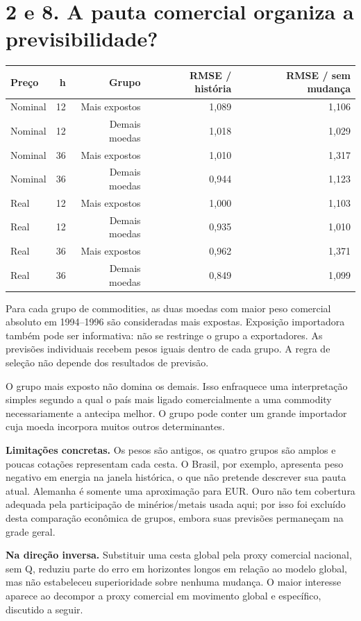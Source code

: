 \documentclass[11pt,a4paper]{article}
\begin{document}
\clearpage
\section*{2 e 8. A pauta comercial organiza a previsibilidade?}\small\begin{center}\begin{tabular}{lrrrr}\toprule
Preço & h & Grupo & RMSE / história & RMSE / sem mudança \\ \midrule
Nominal & 12 & Mais expostos & 1,089 & 1,106 \\
Nominal & 12 & Demais moedas & 1,018 & 1,029 \\
Nominal & 36 & Mais expostos & 1,010 & 1,317 \\
Nominal & 36 & Demais moedas & 0,944 & 1,123 \\
Real & 12 & Mais expostos & 1,000 & 1,103 \\
Real & 12 & Demais moedas & 0,935 & 1,010 \\
Real & 36 & Mais expostos & 0,962 & 1,371 \\
Real & 36 & Demais moedas & 0,849 & 1,099 \\
\bottomrule\end{tabular}\end{center}\normalsize

Para cada grupo de commodities, as duas moedas com maior peso comercial absoluto em 1994--1996 são consideradas mais expostas. Exposição importadora também pode ser informativa: não se restringe o grupo a exportadores. As previsões individuais recebem pesos iguais dentro de cada grupo. A regra de seleção não depende dos resultados de previsão.

O grupo mais exposto não domina os demais. Isso enfraquece uma interpretação simples segundo a qual o país mais ligado comercialmente a uma commodity necessariamente a antecipa melhor. O grupo pode conter um grande importador cuja moeda incorpora muitos outros determinantes.

\textbf{Limitações concretas.} Os pesos são antigos, os quatro grupos são amplos e poucas cotações representam cada cesta. O Brasil, por exemplo, apresenta peso negativo em energia na janela histórica, o que não pretende descrever sua pauta atual. Alemanha é somente uma aproximação para EUR. Ouro não tem cobertura adequada pela participação de minérios/metais usada aqui; por isso foi excluído desta comparação econômica de grupos, embora suas previsões permaneçam na grade geral.

\textbf{Na direção inversa.} Substituir uma cesta global pela proxy comercial nacional, sem Q, reduziu parte do erro em horizontes longos em relação ao modelo global, mas não estabeleceu superioridade sobre nenhuma mudança. O maior interesse aparece ao decompor a proxy comercial em movimento global e específico, discutido a seguir.
\end{document}
